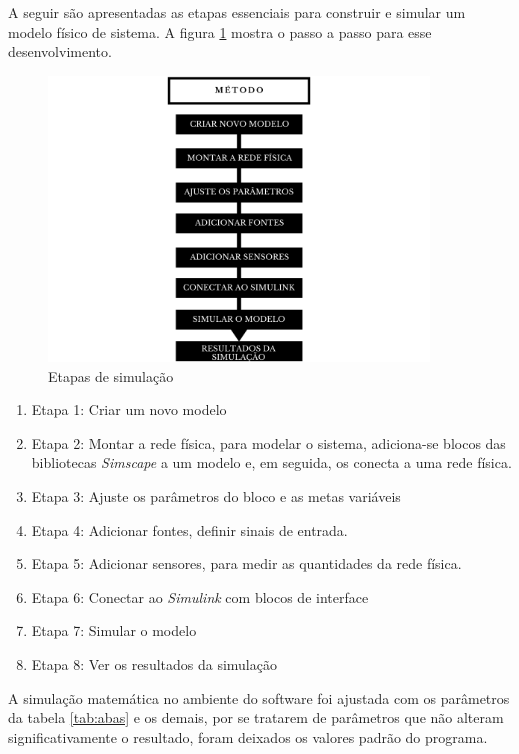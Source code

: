 \par A seguir são apresentadas as etapas essenciais para construir e simular um modelo físico de sistema. A figura \ref{fig:metodologia} mostra o passo a passo para esse desenvolvimento.

\begin{figure}[h!]
\centering
\includegraphics[width=0.9\textwidth]{figuras/metodo.png}
\caption{Etapas de simulação}
\label{fig:metodologia}
\end{figure}

\begin{enumerate}
    \item Etapa 1: Criar um novo modelo 
    \item Etapa 2: Montar a rede física, para modelar o sistema, adiciona-se blocos das bibliotecas \textit{Simscape} a um modelo e, em seguida, os conecta a uma rede física. 
    \item Etapa 3: Ajuste os parâmetros do bloco e as metas variáveis
    \item Etapa 4: Adicionar fontes, definir sinais de entrada.
    \item Etapa 5: Adicionar sensores, para medir as quantidades da rede física. 
    \item Etapa 6: Conectar ao \textit{Simulink} com blocos de interface
    \item Etapa 7: Simular o modelo
    \item Etapa 8: Ver os resultados da simulação
\end{enumerate}


\par A simulação matemática no ambiente do software foi ajustada com os parâmetros da tabela \ref{tab:abas} e os demais, por se tratarem de parâmetros que não alteram significativamente o resultado, foram deixados os valores padrão do programa.

